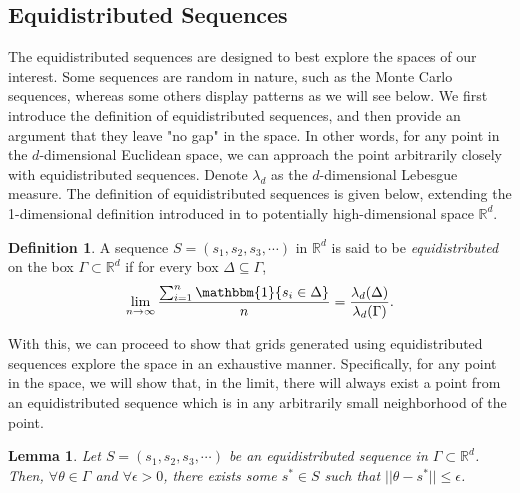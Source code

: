 \documentclass[12pt]{article}
\newtheorem{lemma}{Lemma}
\theoremstyle{definition}
\newtheorem{definition}{Definition}
\begin{document}





\begin{appendices}
\section{Equidistributed Sequences}\label{grid}
The equidistributed sequences are designed to best explore the spaces of our interest. Some sequences are random in nature, such as the Monte Carlo sequences, whereas some others display patterns as we will see below. We first introduce the definition of equidistributed sequences, and then provide an argument that they leave "no gap" in the space. In other words, for any point in the $d$-dimensional Euclidean space, we can approach the point arbitrarily closely with equidistributed sequences. Denote $\lambda_d$ as the $d$-dimensional Lebesgue measure. The definition of equidistributed sequences is given below, extending the 1-dimensional definition introduced in \cite{Chandrasekharan1969} to potentially high-dimensional space $\mathbb{R}^d$. 

\begin{definition}
A sequence $S=(s_1,s_2,s_3,\cdots)$ in $\mathbb{R}^d$ is said to be \textit{equidistributed} on the box $\Gamma\subset\mathbb{R}^d$ if for every box $\Delta\subseteq\Gamma$, 
$$\lim_{n\to\infty}\frac{\sum_{i=1}^n \mathbbm{1}\{s_i\in \Delta\}}{n}=\frac{\lambda_d(\Delta)}{\lambda_d(\Gamma)}.$$
\end{definition}

With this, we can proceed to show that grids generated using equidistributed sequences explore the space in an exhaustive manner. Specifically, for any point in the space, we will show that, in the limit, there will always exist a point from an equidistributed sequence which is in any arbitrarily small neighborhood of the point.

\begin{lemma}\label{lemma3}
Let $S=(s_1,s_2,s_3,\cdots)$ be an equidistributed sequence in $\Gamma\subset\mathbb{R}^d$. Then, $\forall\theta\in\Gamma$ and $\forall\epsilon>0$, there exists some $s^*\in S$ such that $||\theta-s^*||\leq\epsilon$.
\end{lemma}


\end{appendices}
\end{document}
